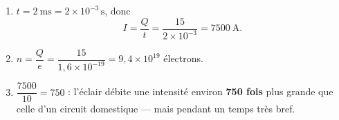 \documentclass[11pt,a4paper]{article}
\begin{document}
\begin{corrige}
\begin{enumerate}[label=\alph*)]
  \item $t=\qty{2}{\milli\second}=2\times10^{-3}\,\si{\second}$, donc
        \[ I=\frac{Q}{t}=\frac{15}{2\times10^{-3}}=\qty{7500}{\ampere}. \]
  \item $n=\dfrac{Q}{e}=\dfrac{15}{1{,}6\times10^{-19}}=9{,}4\times10^{19}$ électrons.
  \item $\dfrac{7500}{10}=750$ : l'éclair débite une intensité environ \textbf{750 fois} plus grande
        que celle d'un circuit domestique — mais pendant un temps très bref.
\end{enumerate}
\end{corrige}
\end{document}
